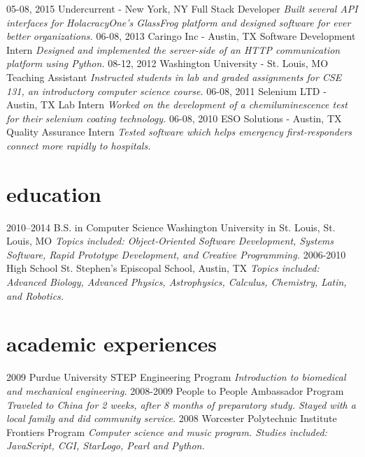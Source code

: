 \documentclass[]{cv}
\begin{document}
\begin{entrylist}
  \entry
    {05-08, 2015}
    {Undercurrent - New York, NY}
    {Full Stack Developer}
    {\emph{Built several API interfaces for HolacracyOne's GlassFrog platform and designed software for ever better organizations.}}
  \entry
    {06-08, 2013}
    {Caringo Inc - Austin, TX}
    {Software Development Intern}
    {\emph{Designed and implemented the server-side of an HTTP communication platform using Python.}}
  \entry
    {08-12, 2012}
    {Washington University - St. Louis, MO}
    {Teaching Assistant}
    {\emph{Instructed students in lab and graded assignments for CSE 131, an introductory computer science course.}}
  \entry
    {06-08, 2011}
    {Selenium LTD - Austin, TX}
    {Lab Intern}
    {\emph{Worked on the development of a chemiluminescence test for their selenium coating technology.}}
  \entry
    {06-08, 2010}
    {ESO Solutions - Austin, TX}
    {Quality Assurance Intern}
    {\emph{Tested software which helps emergency first-responders connect more rapidly to hospitals.}}
\end{entrylist}

\section{education}

\begin{entrylist}
  \entry
    {2010–2014}
    {B.S. in Computer Science}
    {Washington University in St. Louis, St. Louis, MO}
    {\emph{Topics included: Object‐Oriented Software Development, Systems Software, Rapid Prototype Development, and Creative Programming.}}
  \entry
    {2006-2010}
    {High School}
    {St. Stephen’s Episcopal School, Austin, TX}
    {\emph{Topics included: Advanced Biology, Advanced Physics, Astrophysics, Calculus, Chemistry, Latin, and Robotics.}}
\end{entrylist}

\section{academic experiences}

\begin{entrylist}
  \entry
    {2009}
    {Purdue University STEP Engineering Program}{}
    {\emph{Introduction to biomedical and mechanical engineering.}}
  \entry
    {2008-2009}
    {People to People Ambassador Program}{}
    {\emph{Traveled to China for 2 weeks, after 8 months of preparatory study. Stayed with a local family and did community service.}}
  \entry
    {2008}
    {Worcester Polytechnic Institute Frontiers Program}{}
    {\emph{Computer science and music program. Studies included: JavaScript, CGI, StarLogo, Pearl and Python.}}
\end{entrylist}
\end{document}
